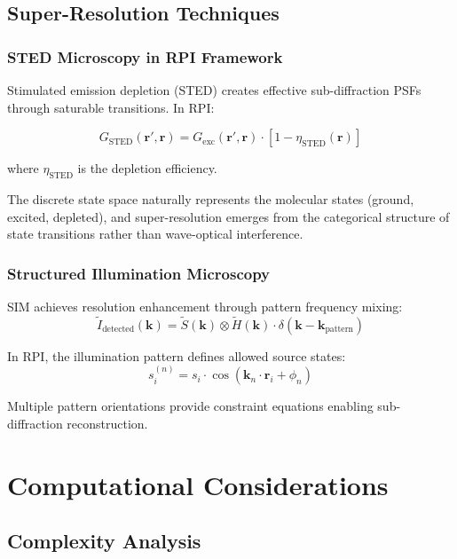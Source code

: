 \documentclass[twocolumn,10pt,a4paper]{article}
\begin{document}
\subsection{Super-Resolution Techniques}

\subsubsection{STED Microscopy in RPI Framework}

Stimulated emission depletion (STED) creates effective sub-diffraction PSFs through saturable transitions. In RPI:

\begin{equation}
G_{\text{STED}}(\mathbf{r}', \mathbf{r}) = G_{\text{exc}}(\mathbf{r}', \mathbf{r}) \cdot \left[1 - \eta_{\text{STED}}(\mathbf{r})\right]
\end{equation}

where $\eta_{\text{STED}}$ is the depletion efficiency.

The discrete state space naturally represents the molecular states (ground, excited, depleted), and super-resolution emerges from the categorical structure of state transitions rather than wave-optical interference.

\subsubsection{Structured Illumination Microscopy}

SIM achieves resolution enhancement through pattern frequency mixing:
\begin{equation}
\tilde{I}_{\text{detected}}(\mathbf{k}) = \tilde{S}(\mathbf{k}) \otimes \tilde{H}(\mathbf{k}) \cdot \delta(\mathbf{k} - \mathbf{k}_{\text{pattern}})
\end{equation}

In RPI, the illumination pattern defines allowed source states:
\begin{equation}
s_i^{(n)} = s_i \cdot \cos(\mathbf{k}_n \cdot \mathbf{r}_i + \phi_n)
\end{equation}

Multiple pattern orientations provide constraint equations enabling sub-diffraction reconstruction.

\section{Computational Considerations}

\subsection{Complexity Analysis}
\end{document}

